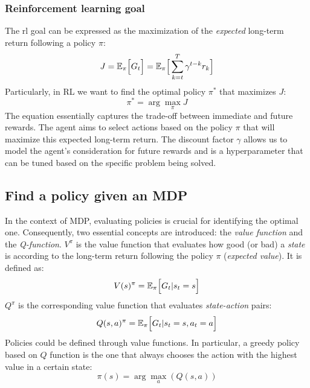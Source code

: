 \subsubsection*{Reinforcement learning goal}
The \ac{rl} goal can be expressed as the maximization of the \emph{expected} 
 long-term return following a policy $\pi$:
\begin{equation}
J = \mathbb{E_\pi}\Big[ G_t \Big] = \mathbb{E}_\pi \Big[ \sum_{k = t}^T \gamma^{t-k} r_k \Big] 
\end{equation}
Particularly, in \ac{RL} we want to find the optimal policy $\pi^*$ that maximizes $J$:
\begin{equation}
\pi^* = \arg \max_{\pi} J
\end{equation}
The equation essentially captures the trade-off between immediate and future rewards. 
 The agent aims to select actions based on the policy \(\pi\) 
 that will maximize this expected long-term return. 
 The discount factor \(\gamma\) allows us to model the agent's consideration 
 for future rewards and is a hyperparameter that can be tuned based on the specific problem being solved.

\subsection{Find a policy given an MDP}
In the context of MDP, 
 evaluating policies is crucial for identifying the optimal one. 
 Consequently, two essential concepts are introduced: 
 the \emph{value function} and the \emph{Q-function}.
$V^\pi$ is the value function that evaluates how good (or bad) a \emph{state} 
 is according to the long-term return following the policy $\pi$ (\emph{expected value}).
% 
It is defined as:
\begin{equation}
V(s)^\pi = \mathbb{E}_\pi \Big[ G_t | s_t = s \Big]
\end{equation}
$Q^\pi$ is the corresponding value function that evaluates \emph{state-action} pairs:
\begin{equation}
Q(s, a)^\pi = \mathbb{E}_\pi \Big[ G_t | s_t = s, a_t = a \Big]
\end{equation}
Policies could be defined through value functions. 
 In particular, a greedy policy based on $Q$ function is the one that always chooses 
 the action with the highest value in a certain state:
\begin{equation}
\pi(s) = \arg \max_{a}(Q(s, a))
\end{equation}
